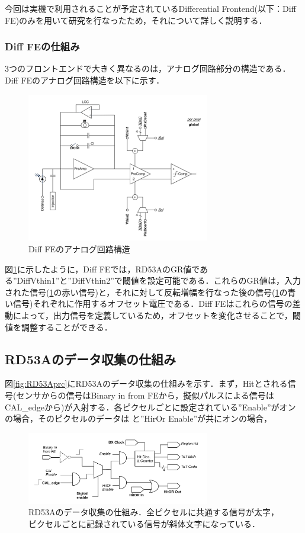 今回は実機で利用されることが予定されているDifferential Frontend(以下：Diff FE)のみを用いて研究を行なったため，それについて詳しく説明する．

\subsubsection*{Diff FEの仕組み}
3つのフロントエンドで大きく異なるのは，アナログ回路部分の構造である．Diff FEのアナログ回路構造を以下に示す．\\

\begin{figure}[h]
\centering
\includegraphics[width=8cm]{./figure/RD53A_DiffFE.png}
\caption{Diff FEのアナログ回路構造}
\label{fig:DiffFE}
\end{figure}

図\ref{fig:DiffFE}に示したように，Diff FEでは，RD53AのGR値である''DiffVthin1''と''DiffVthin2''で閾値を設定可能である．これらのGR値は，入力された信号(\ref{fig:DiffFE}の赤い信号)と，それに対して反転増幅を行なった後の信号(\ref{fig:DiffFE}の青い信号)それぞれに作用するオフセット電圧である．Diff FEはこれらの信号の差動によって，出力信号を定義しているため，オフセットを変化させることで，閾値を調整することができる．

\subsection{RD53Aのデータ収集の仕組み}
図\ref{fig:RD53Aprc}にRD53Aのデータ収集の仕組みを示す．まず，Hitとされる信号(センサからの信号はBinary in from FEから，擬似パルスによる信号はCAL_edgeから)が入射する．各ピクセルごとに設定されている''Enable''がオンの場合，そのピクセルのデータは
と''HirOr Enable''が共にオンの場合，

\begin{figure}[h]
  \centering
  \includegraphics[width=8cm]{./figure/RD53Aproc.png}
  \caption{RD53Aのデータ収集の仕組み．全ピクセルに共通する信号が太字，ピクセルごとに記録されている信号が斜体文字になっている．}
  \label{fig:RD53Aproc}
\end{figure}




